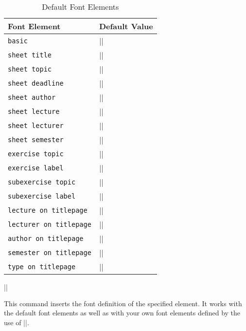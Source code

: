 \documentclass[a4paper,fleqn]{report}
\let\sffamily=\rmfamily
\def\sheettemplatekey#1{\lstinline[language={}]{#1}}
\def\syntaxdefaultarg#1{\hfill\texttt{\small #1}\par\smallskip\noindent\ignorespaces}
\def\metaargument#1{\textit{\small #1}}
\begin{document}
\begin{table}[htbp]
  \caption{Default Font Elements}
  \label{table:font elements}
  \bigskip
  \centering
  \begin{tabular}{ll}
    Font Element        & Default Value \\ \midrule
    \sheettemplatekey{basic}             & |\normalfont\rmfamily| \\
    \sheettemplatekey{sheet title}       & |\sffamily\fontsize{36}{40}\selectfont| \\
    \sheettemplatekey{sheet topic}       & |\sffamily\Huge| \\
    \sheettemplatekey{sheet deadline}    & |\sffamily\LARGE| \\
    \sheettemplatekey{sheet author}      & |\sffamily\small| \\
    \sheettemplatekey{sheet lecture}     & |\sffamily\scriptsize| \\
    \sheettemplatekey{sheet lecturer}    & |\sffamily\scriptsize| \\
    \sheettemplatekey{sheet semester}    & |\sffamily\scriptsize| \\
    \sheettemplatekey{exercise topic}    & |\sffamily\small| \\
    \sheettemplatekey{exercise label}    & |\sffamily\small| \\
    \sheettemplatekey{subexercise topic} & |\sffamily\footnotesize| \\
    \sheettemplatekey{subexercise label} & |\sffamily\footnotesize| \\
    \sheettemplatekey{lecture on titlepage} & |\sffamily\huge| \\
    \sheettemplatekey{lecturer on titlepage} & |\sffamily\large| \\
    \sheettemplatekey{author on titlepage}  & |\sffamily\large| \\
    \sheettemplatekey{semester on titlepage} & |\sffamily\large| \\
    \sheettemplatekey{type on titlepage} & |\sffamily\Large|
  \end{tabular}
\end{table}

\begin{syntax}
  |\usesheetfont{|\metaargument{name of element}|}|
  \syntaxdefaultarg{}
  This command inserts the font definition of the specified element.
  It works with the default font elements as well as with your own
  font elements defined by the use of |\setsheetfont|.
\end{syntax}
\end{document}
